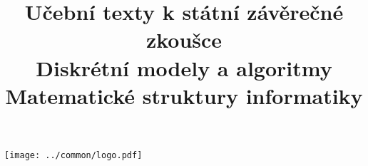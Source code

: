 \clearpage

\clearpage

\title{\LARGE Učební texty k státní závěrečné zkoušce \\ Diskrétní modely a algoritmy \\ Matematické struktury informatiky}




\maketitle

\vspace{10mm}
\begin{center}
\texttt{[image: ../common/logo.pdf]}
\end{center} 

\clearpage

\clearpage

\tableofcontents







